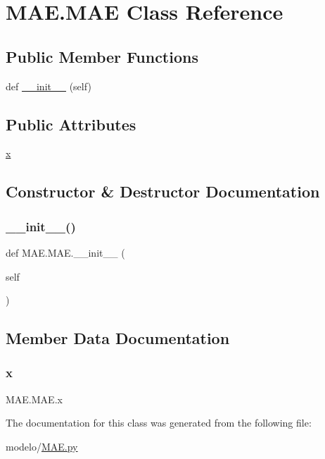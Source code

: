 \hypertarget{class_m_a_e_1_1_m_a_e}{}\section{M\+A\+E.\+M\+AE Class Reference}
\label{class_m_a_e_1_1_m_a_e}
\subsection*{Public Member Functions}
\begin{DoxyCompactItemize}
\item 
def \mbox{\hyperlink{class_m_a_e_1_1_m_a_e_acf334c43862b1112d21fa019c3827bd0}{\+\_\+\+\_\+init\+\_\+\+\_\+}} (self)
\end{DoxyCompactItemize}
\subsection*{Public Attributes}
\begin{DoxyCompactItemize}
\item 
\mbox{\hyperlink{class_m_a_e_1_1_m_a_e_ae516329fc350a56b5a50fe0b922aa6fa}{x}}
\end{DoxyCompactItemize}


\subsection{Constructor \& Destructor Documentation}
\mbox{\label{class_m_a_e_1_1_m_a_e_acf334c43862b1112d21fa019c3827bd0}} 
\subsubsection{\texorpdfstring{\+\_\+\+\_\+init\+\_\+\+\_\+()}{\_\_init\_\_()}}
{\footnotesize\ttfamily def M\+A\+E.\+M\+A\+E.\+\_\+\+\_\+init\+\_\+\+\_\+ (\begin{DoxyParamCaption}\item[{}]{self }\end{DoxyParamCaption})}



\subsection{Member Data Documentation}
\mbox{\label{class_m_a_e_1_1_m_a_e_ae516329fc350a56b5a50fe0b922aa6fa}} 
\subsubsection{\texorpdfstring{x}{x}}
{\footnotesize\ttfamily M\+A\+E.\+M\+A\+E.\+x}



The documentation for this class was generated from the following file\+:\begin{DoxyCompactItemize}
\item 
modelo/\mbox{\hyperlink{_m_a_e_8py}{M\+A\+E.\+py}}\end{DoxyCompactItemize}

